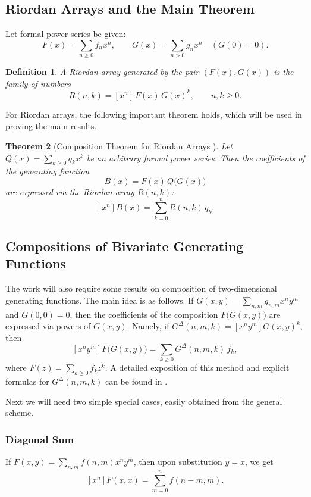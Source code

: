 \documentclass[12pt]{article}
\newtheorem{theorem}{Theorem}[section]
\newtheorem{definition}[theorem]{Definition}
\begin{document}
\subsection{Riordan Arrays and the Main Theorem}

Let formal power series be given:
\[
F(x)=\sum_{n\geqslant 0} f_n x^n, \qquad G(x)=\sum_{n>0} g_n x^n \quad (G(0)=0).
\]
\begin{definition}
    A Riordan array generated by the pair $(F(x), G(x))$ is the family of numbers
    \[
    R(n,k)=[x^n]\,F(x)\,G(x)^k, \qquad n,k\ge 0.
    \]
\end{definition}

For Riordan arrays, the following important theorem holds, which will be used in proving the main results.

\begin{theorem}[Composition Theorem for Riordan Arrays \cite{Shapiro}]
    Let $Q(x)=\sum_{k\ge 0} q_k x^k$ be an arbitrary formal power series. Then the coefficients of the generating function
    \[
    B(x)=F(x)\,Q\bigl(G(x)\bigr)
    \]
    are expressed via the Riordan array $R(n,k)$:
    \begin{equation}\label{eq:riordan-composition}
    [x^n]B(x)=\sum_{k=0}^n R(n,k)\,q_k.
    \end{equation}
\end{theorem}

\subsection{Compositions of Bivariate Generating Functions}
The work will also require some results on composition of two-dimensional generating functions.\! The main idea is as follows.\! If  $G(x,y)=\sum_{n,m} g_{n,m}x^n y^m$ and $G(0,0)=0$, then the coefficients of the composition $F\bigl(G(x,y)\bigr)$ are expressed via powers of $G(x,y)$. Namely, if $G^{\Delta}(n,m,k)=[x^n y^m]G(x,y)^k$, then
\begin{equation}\label{eq:2d-composition-idea}
[x^n y^m]F\bigl(G(x,y)\bigr)=\sum_{k\ge 0} G^{\Delta}(n,m,k)\,f_k,
\end{equation}
where $F(z)=\sum_{k\ge 0} f_k z^k$. A detailed exposition of this method and explicit formulas for $G^{\Delta}(n,m,k)$ can be found in \cite{KruBivar}.

Next we will need two simple special cases, easily obtained from the general scheme.

\subsubsection{Diagonal Sum}
If $F(x,y)=\sum_{n,m} f(n,m)x^n y^m$, then upon substitution $y=x$, we get
\begin{equation}\label{eq:diag-sum}
[x^n]F(x,x)=\sum_{m=0}^n f(n-m,m).
\end{equation}
\end{document}
